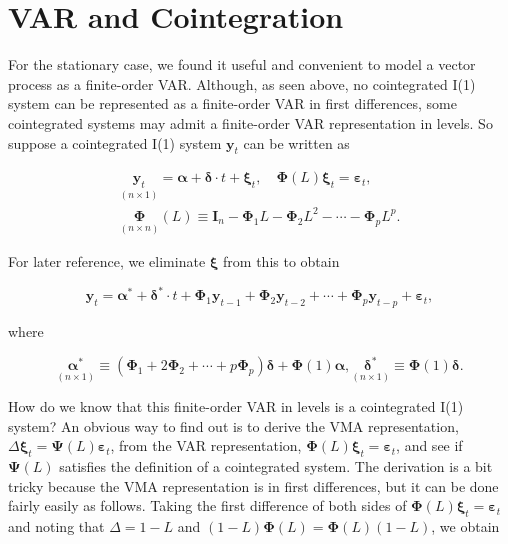 \documentclass[10pt]{article}
\begin{document}
\section*{VAR and Cointegration}
For the stationary case, we found it useful and convenient to model a vector process as a finite-order VAR. Although, as seen above, no cointegrated I(1) system can be represented as a finite-order VAR in first differences, some cointegrated systems may admit a finite-order VAR representation in levels. So suppose a cointegrated I(1) system $\mathbf{y}_{t}$ can be written as


\begin{gather*}
\underset{(n \times 1)}{\mathbf{y}_{t}}=\boldsymbol{\alpha}+\boldsymbol{\delta} \cdot t+\boldsymbol{\xi}_{t}, \quad \boldsymbol{\Phi}(L) \boldsymbol{\xi}_{t}=\boldsymbol{\varepsilon}_{t}, \\
\underset{(n \times n)}{\boldsymbol{\Phi}}(L) \equiv \mathbf{I}_{n}-\boldsymbol{\Phi}_{1} L-\boldsymbol{\Phi}_{2} L^{2}-\cdots-\boldsymbol{\Phi}_{p} L^{p} . \tag{10.2.12}
\end{gather*}


For later reference, we eliminate $\boldsymbol{\xi}$ from this to obtain


\begin{equation*}
\mathbf{y}_{t}=\boldsymbol{\alpha}^{*}+\boldsymbol{\delta}^{*} \cdot t+\boldsymbol{\Phi}_{1} \mathbf{y}_{t-1}+\boldsymbol{\Phi}_{2} \mathbf{y}_{t-2}+\cdots+\boldsymbol{\Phi}_{p} \mathbf{y}_{t-p}+\boldsymbol{\varepsilon}_{t}, \tag{10.2.13}
\end{equation*}


where


\begin{equation*}
\underset{(n \times 1)}{\boldsymbol{\alpha}^{*}} \equiv\left(\boldsymbol{\Phi}_{1}+2 \boldsymbol{\Phi}_{2}+\cdots+p \boldsymbol{\Phi}_{p}\right) \boldsymbol{\delta}+\boldsymbol{\Phi}(1) \boldsymbol{\alpha}, \underset{(n \times 1)}{\boldsymbol{\delta}^{*}} \equiv \boldsymbol{\Phi}(1) \boldsymbol{\delta} . \tag{10.2.14}
\end{equation*}


How do we know that this finite-order VAR in levels is a cointegrated I(1) system? An obvious way to find out is to derive the VMA representation, $\Delta \boldsymbol{\xi}_{t}= \boldsymbol{\Psi}(L) \boldsymbol{\varepsilon}_{t}$, from the VAR representation, $\boldsymbol{\Phi}(L) \boldsymbol{\xi}_{t}=\boldsymbol{\varepsilon}_{t}$, and see if $\boldsymbol{\Psi}(L)$ satisfies the definition of a cointegrated system. The derivation is a bit tricky because the VMA representation is in first differences, but it can be done fairly easily as follows. Taking the first difference of both sides of $\boldsymbol{\Phi}(L) \boldsymbol{\xi}_{t}=\boldsymbol{\varepsilon}_{t}$ and noting that $\Delta=1-L$ and $(1-L) \boldsymbol{\Phi}(L)=\boldsymbol{\Phi}(L)(1-L)$, we obtain
\end{document}
